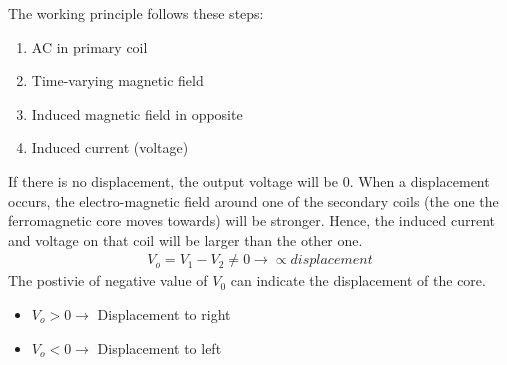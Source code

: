 \documentclass[class=report, crop=false, 12pt,a4paper]{standalone}
\begin{document}
The working principle follows these steps:
\begin{enumerate}
  \item AC in primary coil
  \item Time-varying magnetic field
  \item Induced magnetic field in opposite
  \item Induced current (voltage)
\end{enumerate}
If there is no displacement, the output voltage will be 0. When a displacement occurs, the electro-magnetic field around one of the secondary coils (the one the ferromagnetic core moves towards) will be stronger. Hence, the induced current and voltage on that coil will be larger than the other one. 
\begin{gather}
  V_o = V_1-V_2 \neq 0 \rightarrow \propto displacement
\end{gather}
The postivie of negative value of $V_0$ can indicate the displacement of the core.
\begin{itemize}
  \item $V_o>0 \longrightarrow$ Displacement to right
  \item $V_o<0 \longrightarrow$ Displacement to left
\end{itemize}
\end{document}

